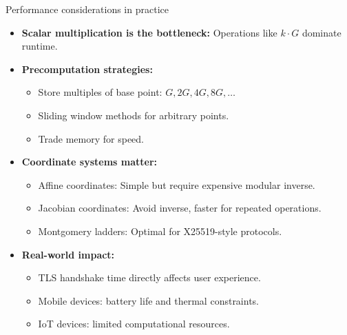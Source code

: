 \documentclass[aspectratio=169, lualatex, handout]{beamer}
\begin{document}
\begin{frame}{Performance considerations in practice}
	\begin{itemize}[<+->]
		\item \textbf{Scalar multiplication is the bottleneck:} Operations like $k \cdot G$ dominate runtime.
		\item \textbf{Precomputation strategies:}
		      \begin{itemize}
			      \item Store multiples of base point: $G, 2G, 4G, 8G, \ldots$
			      \item Sliding window methods for arbitrary points.
			      \item Trade memory for speed.
		      \end{itemize}
		\item \textbf{Coordinate systems matter:}
		      \begin{itemize}
			      \item Affine coordinates: Simple but require expensive modular inverse.
			      \item Jacobian coordinates: Avoid inverse, faster for repeated operations.
			      \item Montgomery ladders: Optimal for X25519-style protocols.
		      \end{itemize}
		\item \textbf{Real-world impact:}
		      \begin{itemize}
			      \item TLS handshake time directly affects user experience.
			      \item Mobile devices: battery life and thermal constraints.
			      \item IoT devices: limited computational resources.
		      \end{itemize}
	\end{itemize}
\end{frame}
\end{document}
